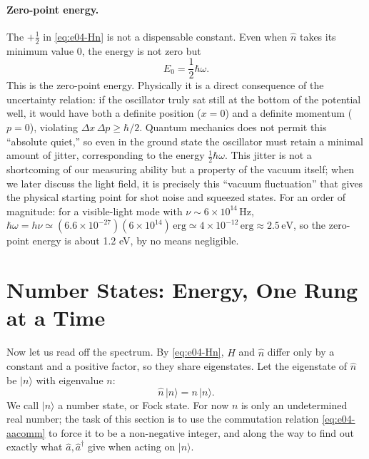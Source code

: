 \paragraph{Zero-point energy.}
The \(+\tfrac12\) in \eqref{eq:e04-Hn} is not a dispensable constant. Even when \(\hat n\) takes its minimum value 0, the energy is not zero but
\[
  E_0=\frac12\hbar\omega .
\]
This is the zero-point energy. Physically it is a direct consequence of the uncertainty relation: if the oscillator truly sat still at the bottom of the potential well, it would have both a definite position (\(x=0\)) and a definite momentum (\(p=0\)), violating \(\Delta x\,\Delta p\ge\hbar/2\). Quantum mechanics does not permit this ``absolute quiet,'' so even in the ground state the oscillator must retain a minimal amount of jitter, corresponding to the energy \(\tfrac12\hbar\omega\). This jitter is not a shortcoming of our measuring ability but a property of the vacuum itself; when we later discuss the light field, it is precisely this ``vacuum fluctuation'' that gives the physical starting point for shot noise and squeezed states. For an order of magnitude: for a visible-light mode with \(\nu\sim6\times10^{14}\,\mathrm{Hz}\), \(\hbar\omega=h\nu\simeq(6.6\times10^{-27})(6\times10^{14})\,\mathrm{erg}\simeq4\times10^{-12}\,\mathrm{erg}\approx2.5\,\mathrm{eV}\), so the zero-point energy is about 1.2 eV, by no means negligible.

\section{Number States: Energy, One Rung at a Time}
\label{sec:e04-numberstates}

Now let us read off the spectrum. By \eqref{eq:e04-Hn}, \(\hat H\) and \(\hat n\) differ only by a constant and a positive factor, so they share eigenstates. Let the eigenstate of \(\hat n\) be \(|n\rangle\) with eigenvalue \(n\):
\[
  \hat n\,|n\rangle=n\,|n\rangle .
\]
We call \(|n\rangle\) a number state, or Fock state. For now \(n\) is only an undetermined real number; the task of this section is to use the commutation relation \eqref{eq:e04-aacomm} to force it to be a non-negative integer, and along the way to find out exactly what \(\hat a,\hat a^\dagger\) give when acting on \(|n\rangle\).

